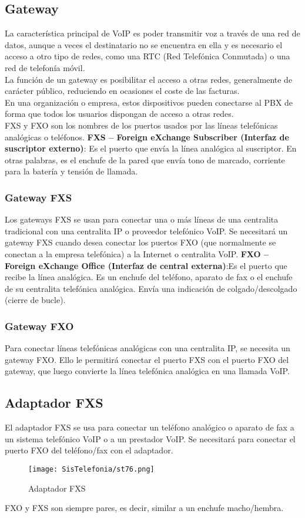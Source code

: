 \documentclass[
	12pt, %
	fleqn, %
	a4paper, %
]{LegrandOrangeBook}
\begin{document}
\subsection{Gateway}
La característica principal de VoIP es poder transmitir voz a través de una red de datos, aunque a veces el destinatario no se encuentra en ella y es necesario el acceso a otro tipo de redes, como una RTC (Red Telefónica Conmutada) o una red de telefonía móvil.\\
La función de un gateway es posibilitar el acceso a otras redes, generalmente de carácter público, reduciendo en ocasiones el coste de las facturas.\\
En una organización o empresa, estos dispositivos pueden conectarse al PBX de forma que todos los usuarios dispongan de acceso a otras redes.\\
FXS y FXO son los nombres de los puertos usados por las líneas telefónicas analógicas o teléfonos.
\textbf{FXS – Foreign eXchange Subscriber (Interfaz de suscriptor externo)}: Es el puerto que envía la línea analógica al suscriptor. En otras palabras, es el enchufe de la pared que envía tono de marcado, corriente para la batería y tensión de llamada.
\subsubsection{Gateway FXS}
Los gateways FXS se usan para conectar una o más líneas de una centralita tradicional con una centralita IP o proveedor telefónico VoIP. 
Se necesitará un gateway FXS cuando desea conectar los puertos FXO (que normalmente se conectan a la empresa telefónica) a la Internet o centralita VoIP.
\textbf{FXO – Foreign eXchange Office (Interfaz de central externa)}:Es el puerto que recibe la línea analógica. Es un enchufe del teléfono, aparato de fax o el enchufe de su centralita telefónica analógica. Envía una indicación de colgado/descolgado (cierre de bucle).
\subsubsection{Gateway FXO}
Para conectar líneas telefónicas analógicas con una centralita IP, se necesita un gateway FXO.
Ello le permitirá conectar el puerto FXS con el puerto FXO del gateway, que luego convierte la línea telefónica analógica en una llamada VoIP.
\subsection{Adaptador FXS}
El adaptador FXS se usa para conectar un teléfono analógico o aparato de fax a un sistema telefónico VoIP o a un prestador VoIP.
Se necesitará para conectar el puerto FXO del teléfono/fax con el adaptador.
\begin{figure}[H]
\centering
\texttt{[image: SisTelefonia/st76.png]}
\caption{Adaptador FXS}
\label{fig:adaptadorfsx}
\end{figure}
FXO y FXS son siempre pares, es decir, similar a un enchufe macho/hembra.
\end{document}
